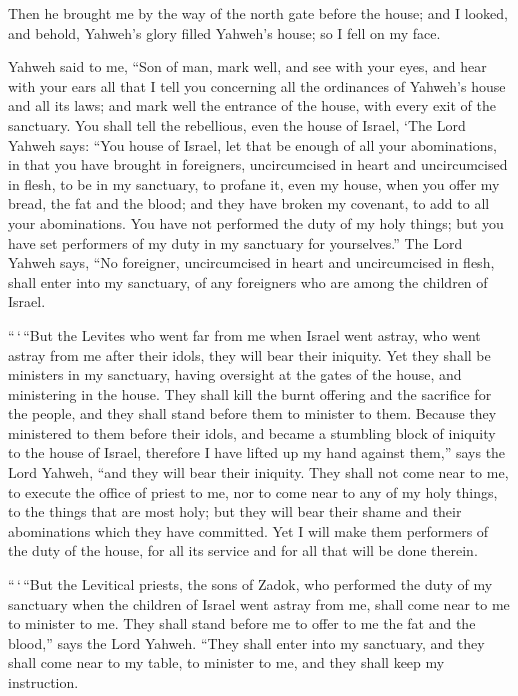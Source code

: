  Then he brought me by the way of the north gate before
the house; and I looked, and behold, Yahweh's glory filled Yahweh's
house; so I fell on my face.

 Yahweh said to me, ``Son of man, mark well, and see with
your eyes, and hear with your ears all that I tell you concerning all
the ordinances of Yahweh's house and all its laws; and mark well the
entrance of the house, with every exit of the sanctuary. 
You shall tell the rebellious, even the house of Israel, `The Lord
Yahweh says: ``You house of Israel, let that be enough of all your
abominations,  in that you have brought in foreigners,
uncircumcised in heart and uncircumcised in flesh, to be in my
sanctuary, to profane it, even my house, when you offer my bread, the
fat and the blood; and they have broken my covenant, to add to all your
abominations.  You have not performed the duty of my holy
things; but you have set performers of my duty in my sanctuary for
yourselves.''  The Lord Yahweh says, ``No foreigner,
uncircumcised in heart and uncircumcised in flesh, shall enter into my
sanctuary, of any foreigners who are among the children of Israel.

 ``\,`\,``But the Levites who went far from me when
Israel went astray, who went astray from me after their idols, they will
bear their iniquity.  Yet they shall be ministers in my
sanctuary, having oversight at the gates of the house, and ministering
in the house. They shall kill the burnt offering and the sacrifice for
the people, and they shall stand before them to minister to them.
 Because they ministered to them before their idols, and
became a stumbling block of iniquity to the house of Israel, therefore I
have lifted up my hand against them,'' says the Lord Yahweh, ``and they
will bear their iniquity.  They shall not come near to
me, to execute the office of priest to me, nor to come near to any of my
holy things, to the things that are most holy; but they will bear their
shame and their abominations which they have committed. 
Yet I will make them performers of the duty of the house, for all its
service and for all that will be done therein.

 ``\,`\,``But the Levitical priests, the sons of Zadok,
who performed the duty of my sanctuary when the children of Israel went
astray from me, shall come near to me to minister to me. They shall
stand before me to offer to me the fat and the blood,'' says the Lord
Yahweh.  ``They shall enter into my sanctuary, and they
shall come near to my table, to minister to me, and they shall keep my
instruction.

